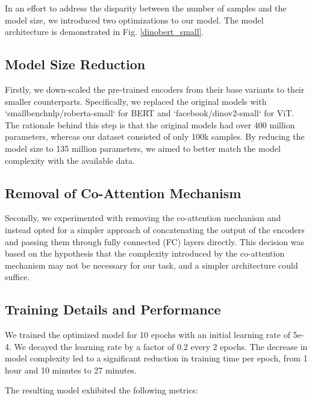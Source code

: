 \documentclass[conference]{IEEEtran}
\begin{document}
In an effort to address the disparity between the number of samples and the model size, we introduced two optimizations to our model. The model architecture is demonstrated in Fig. \ref{dinobert_small}.

\subsection*{Model Size Reduction}
Firstly, we down-scaled the pre-trained encoders from their base variants to their smaller counterparts. Specifically, we replaced the original models with `smallbenchnlp/roberta-small` for BERT and `facebook/dinov2-small` for ViT. The rationale behind this step is that the original models had over 400 million parameters, whereas our dataset consisted of only 100k samples. By reducing the model size to 135 million parameters, we aimed to better match the model complexity with the available data.

\subsection*{Removal of Co-Attention Mechanism}

Secondly, we experimented with removing the co-attention mechanism and instead opted for a simpler approach of concatenating the output of the encoders and passing them through fully connected (FC) layers directly. This decision was based on the hypothesis that the complexity introduced by the co-attention mechanism may not be necessary for our task, and a simpler architecture could suffice.

\subsection*{Training Details and Performance}

We trained the optimized model for 10 epochs with an initial learning rate of 5e-4. We decayed the learning rate by a factor of 0.2 every 2 epochs. The decrease in model complexity led to a significant reduction in training time per epoch, from 1 hour and 10 minutes to 27 minutes.

The resulting model exhibited the following metrics:
\end{document}
